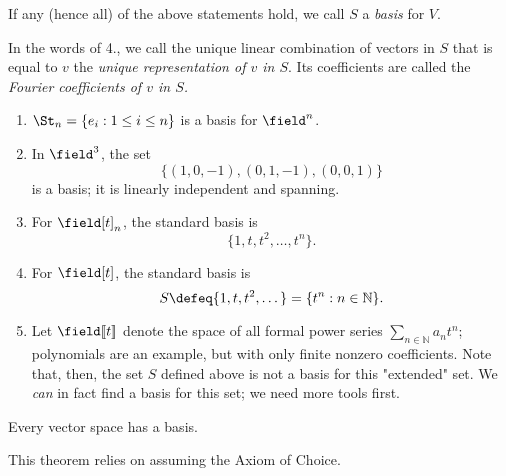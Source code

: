 \begin{definition}[Basis]
    If any (hence all) of the above statements hold, we call $S$ a \emph{basis} for $V$.

    In the words of 4., we call the unique linear combination of vectors in $S$ that is equal to $v$ the \emph{unique representation of $v$ in $S$}. Its coefficients are called the \emph{Fourier coefficients of $v$ in $S$.}
\end{definition}

\begin{example}
    \begin{enumerate}
        \item $\St_n = \{e_i : 1 \leq i \leq n\}$ is a basis for $\field^n$.
        \item In $\field^3$, the set \[
        \{(1, 0, -1), (0, 1, -1), (0,0,1)\}    
        \]
        is a basis; it is linearly independent and spanning.
        \item For $\field[t]_n$, the standard basis is \[
        \{1, t, t^2, \dots, t^n\}.
        \]
        \item For $\field[t]$, the standard basis is \[
        S \defeq \{1, t, t^2, \dots\} = \{t^n : n \in \mathbb{N}\}.
        \]
        \item Let $\field[\![t]\!]$ denote the space of all formal power series $\sum_{n \in \mathbb{N}} a_n t^n$; polynomials are an example, but with only finite nonzero coefficients. Note that, then, the set $S$ defined above is not a basis for this "extended" set. We \emph{can} in fact find a basis for this set; we need more tools first.
    \end{enumerate}
\end{example}

\begin{theorem}\label{thm:vectorspacebases}
    Every vector space has a basis.
\end{theorem}

\begin{remark}
    This theorem relies on assuming the Axiom of Choice.
\end{remark}
